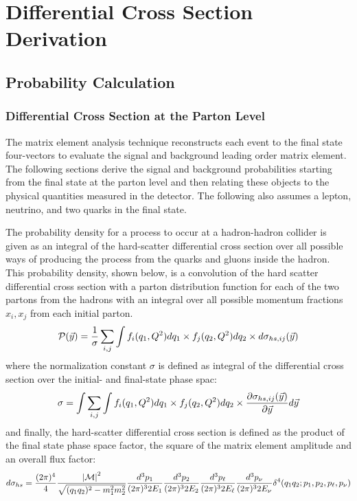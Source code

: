 \chapter{Differential Cross Section Derivation}
\section{Probability Calculation}
\label{full}

\subsection{Differential Cross Section at the Parton Level}

The matrix element analysis technique reconstructs each event to the
final state four-vectors to evaluate the signal and background leading
order matrix element. The following sections derive the signal and
background probabilities starting from the final state at the parton
level and then relating these objects to the physical quantities
measured in the detector. The following also assumes a lepton,
neutrino, and two quarks in the final state.

The probability density for a process to occur at a hadron-hadron
collider is given as an integral of the hard-scatter differential
cross section over all possible ways of producing the process from the
quarks and gluons inside the hadron. This probability density, shown
below, is a convolution of the hard scatter differential cross section
with a parton distribution function for each of the two partons from
the hadrons with an integral over all possible momentum fractions
$x_{i}, x_{j}$ from each initial parton.
\begin{equation}
{\cal P}(\vec{y}) = \frac{1}{\sigma} \sum_{i,j}
\int f_{i}(q_{1}, Q^{2})dq_{1}
\times f_{j}(q_{2}, Q^{2})dq_{2}
\times d\sigma_{hs,ij}(\vec{y})
\end{equation}
\noindent where the normalization constant $\sigma$ is defined as
integral of the differential cross section over the initial- and
final-state phase spac:
\begin{equation}
\label{ds}
\sigma = \int  \sum_{i,j}
\int f_{i}(q_{1}, Q^{2})dq_{1}
\times f_{j}(q_{2}, Q^{2})dq_{2}
\times \frac{\partial \sigma_{hs,ij}(\vec{y})}{\partial \vec{y}} d\vec{y}
\end{equation}
\noindent and finally, the hard-scatter differential cross section is
defined as the product of the final state phase space factor, the
square of the matrix element amplitude and an overall flux factor:
\begin{equation}
d\sigma_{hs} = \frac{(2\pi)^4}{4}
\frac{{|\cal M|}^{2}}
{\sqrt{(q_{1}q_{2})^2 - m_{1}^2 m_{2}^2}}
\frac{d^{3}p_{1}}{(2\pi)^3 2E_{1}}
\frac{d^{3}p_{2}}{(2\pi)^3 2E_{2}}
\frac{d^{3}p_{\ell}}{(2\pi)^3 2E_{\ell}}
\frac{d^{3}p_{\nu}}{(2\pi)^3 2E_{\nu}}
\delta^{4}(q_{1}q_{2};p_{1},p_{2},p_{\ell},p_{\nu})
\end{equation}


